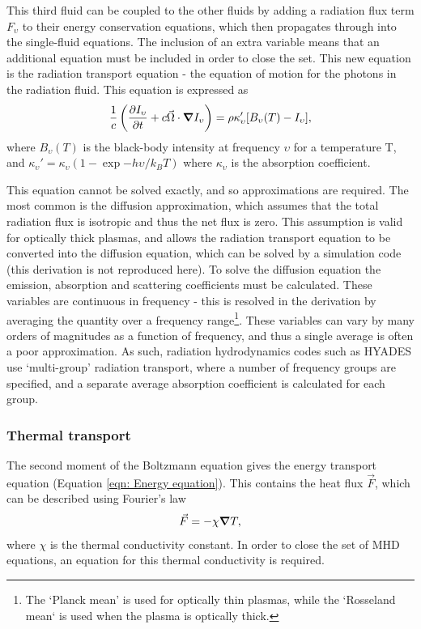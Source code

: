 This third fluid can be coupled to the other fluids by adding a radiation flux term $F_{\upsilon}$ to their energy conservation equations, which then propagates through into the single-fluid equations. The inclusion of an extra variable means that an additional equation must be included in order to close the set. This new equation is the radiation transport equation - the equation of motion for the photons in the radiation fluid. This equation is expressed as 
\begin{equation} \frac{1}{c} \left( \frac{\partial I_\upsilon}{\partial t} + c \vec{\Omega} \cdot \grad I_{\upsilon} \right) = \rho \kappa_\upsilon' [B_\upsilon (T) - I_\upsilon], \end{equation} where $B_\upsilon (T)$ is the black-body intensity at frequency $\upsilon$ for a temperature T, and $\kappa_\upsilon' = \kappa_\upsilon ( 1 - \exp{-h\upsilon / k_B T})$ where $\kappa_\upsilon$ is the absorption coefficient.

This equation cannot be solved exactly, and so approximations are required. The most common is the diffusion approximation, which assumes that the total radiation flux is isotropic and thus the net flux is zero. This assumption is valid for optically thick plasmas, and allows the radiation transport equation to be converted into the diffusion equation, which can be solved by a simulation code (this derivation is not reproduced here). To solve the diffusion equation the emission, absorption and scattering coefficients must be calculated. These variables are continuous in frequency - this is resolved in the derivation by averaging the quantity over a frequency range\footnote{The `Planck mean' is used for optically thin plasmas, while the `Rosseland mean` is used when the plasma is optically thick.}. These variables can vary by many orders of magnitudes as a function of frequency, and thus a single average is often a poor approximation. As such, radiation hydrodynamics codes such as HYADES use `multi-group' radiation transport, where a number of frequency groups are specified, and a separate average absorption coefficient is calculated for each group.

\subsubsection{Thermal transport}

The second moment of the Boltzmann equation gives the energy transport equation (Equation \ref{eqn: Energy equation}). This contains the heat flux $\vec{F}$, which can be described using Fourier's law 
\begin{equation} \vec{F} = - \chi \grad T, \end{equation} where $\chi$ is the thermal conductivity constant. In order to close the set of MHD equations, an equation for this thermal conductivity is required.

